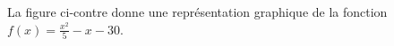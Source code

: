 
\begin{exercice}\label{exosmath-0435}

    La figure ci-contre donne une représentation graphique de la fonction \( f(x)=\frac{ x^2 }{ 5 }-x-30\).

\end{exercice}
